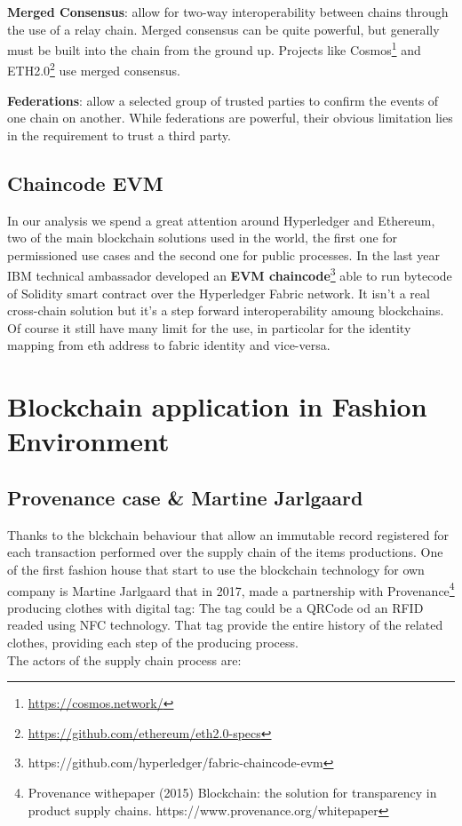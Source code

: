 \begin{outline}
    \1 \textbf{Merged Consensus}: allow for two-way interoperability between chains through the use of a relay 
    chain. Merged consensus can be quite powerful, but generally must be built into the chain from the ground 
    up. Projects like Cosmos\footnote{\url{https://cosmos.network/}} and ETH2.0\footnote{\url{https://github.com/ethereum/eth2.0-specs}} use merged consensus.

    \1 \textbf{Federations}: allow a selected group of trusted parties to confirm the events of one chain on 
    another. While federations are powerful, their obvious limitation lies in the requirement to trust a 
    third party.

\end{outline}

\subsection{Chaincode EVM}

In our analysis we spend a great attention around Hyperledger and Ethereum, two of the main blockchain
solutions used in the world, the first one for permissioned use cases and the second one for public
processes. In the last year IBM technical ambassador developed an \textbf{EVM chaincode}\footnote{https://github.com/hyperledger/fabric-chaincode-evm} able to run
bytecode of Solidity smart contract over the Hyperledger Fabric network. It isn't a real cross-chain solution 
but it's a step forward interoperability amoung blockchains. Of course it still have many limit 
for the use, in particolar for the identity mapping from eth address to fabric identity and vice-versa. 


\section{Blockchain application in Fashion Environment}

\subsection{Provenance case & Martine Jarlgaard}

Thanks to the blckchain behaviour that allow an immutable record registered for each transaction 
performed over the supply chain of the items productions.
One of the first fashion house that start to use the blockchain technology for own company is 
Martine Jarlgaard that in 2017, made a partnership with Provenance\footnote{Provenance withepaper (2015) Blockchain: the solution for transparency in product supply chains. https://www.provenance.org/whitepaper} 
producing clothes with digital tag: The tag could be a QRCode od an RFID readed using NFC technology.
That tag provide the entire history of the related clothes, providing each step of the producing process.
\\
The actors of the supply chain process are:

